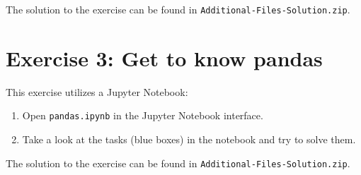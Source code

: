 \documentclass[
english,
smallborders
]{i6prcsht}
\begin{document}
\begin{solution}
	The solution to the exercise can be found in \texttt{Additional-Files-Solution.zip}.
\end{solution}

\section*{Exercise 3: Get to know pandas}

This exercise utilizes a Jupyter Notebook:

\begin{enumerate}
	\item Open \texttt{pandas.ipynb} in the Jupyter Notebook interface.
	\item Take a look at the tasks (blue boxes) in the notebook and try to solve them.
\end{enumerate}

\begin{solution}
	The solution to the exercise can be found in \texttt{Additional-Files-Solution.zip}.
\end{solution}
\end{document}
